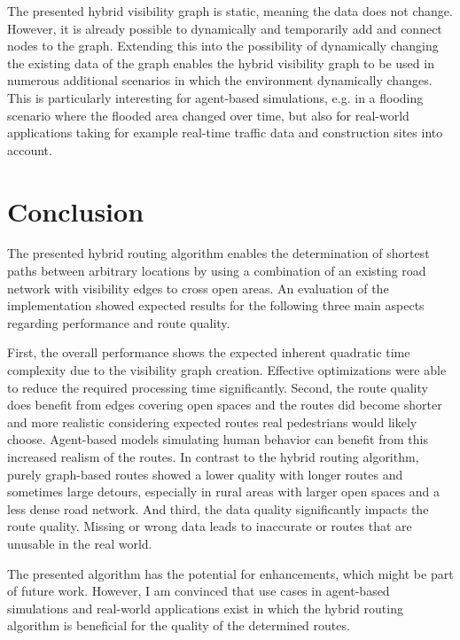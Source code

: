 		The presented hybrid visibility graph is static, meaning the data does not change.
		However, it is already possible to dynamically and temporarily add and connect nodes to the graph.
		Extending this into the possibility of dynamically changing the existing data of the graph enables the hybrid visibility graph to be used in numerous additional scenarios in which the environment dynamically changes.
		This is particularly interesting for agent-based simulations, e.g. in a flooding scenario where the flooded area changed over time, but also for real-world applications taking for example real-time traffic data and construction sites into account.
		
\section{Conclusion}

	The presented hybrid routing algorithm enables the determination of shortest paths between arbitrary locations by using a combination of an existing road network with visibility edges to cross open areas.
	An evaluation of the implementation showed expected results for the following three main aspects regarding performance and route quality.
	
	First, the overall performance shows the expected inherent quadratic time complexity due to the visibility graph creation.
	Effective optimizations were able to reduce the required processing time significantly.
	Second, the route quality does benefit from edges covering open spaces and the routes did become shorter and more realistic considering expected routes real pedestrians would likely choose.
	Agent-based models simulating human behavior can benefit from this increased realism of the routes.
	In contrast to the hybrid routing algorithm, purely graph-based routes showed a lower quality with longer routes and sometimes large detours, especially in rural areas with larger open spaces and a less dense road network.
	And third, the data quality significantly impacts the route quality.
	Missing or wrong data leads to inaccurate or routes that are unusable in the real world.
	
	The presented algorithm has the potential for enhancements, which might be part of future work.
	However, I am convinced that use cases in agent-based simulations and real-world applications exist in which the hybrid routing algorithm is beneficial for the quality of the determined routes.